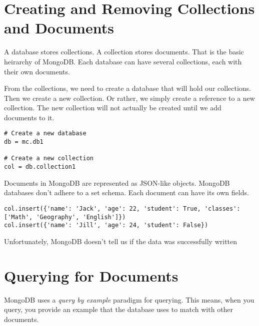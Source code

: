 \section*{Creating and Removing Collections and Documents}
A database stores collections.
A collection stores documents.
That is the basic heirarchy of MongoDB.
Each database can have several collections, each with their own documents.

From the collections, we need to create a database that will hold our collections.
Then we create a new collection.
Or rather, we simply create a reference to a new collection.
The new collection will not actually be created until we add documents to it.
\begin{lstlisting}
# Create a new database
db = mc.db1

# Create a new collection
col = db.collection1
\end{lstlisting}

Documents in MongoDB are represented as JSON-like objects.
MongoDB databases don't adhere to a set schema.
Each document can have its own fields.
\begin{lstlisting}
col.insert({'name': 'Jack', 'age': 22, 'student': True, 'classes': ['Math', 'Geography', 'English']})
col.insert({'name': 'Jill', 'age': 24, 'student': False})
\end{lstlisting}
Unfortunately, MongoDB doesn't tell us if the data was successfully written


\section*{Querying for Documents}
MongoDB uses a \emph{query by example} paradigm for querying.
This means, when you query, you provide an example that the database uses to match with other documents.